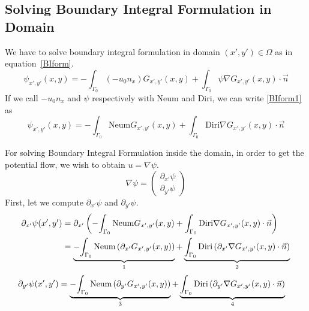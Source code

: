 \documentclass[a4paper,12pt]{article}
\newcommand{\integ}[3]{%
\ensuremath{\displaystyle{\int^{#2}_{#1} #3}}}
\begin{document}
\subsection{Solving Boundary Integral Formulation in Domain}

We have to solve boundary integral formulation in domain $(x',y')\in \Omega$ as in equation~\eqref{BIform}. 
\begin{equation}
 \psi_{x',y'}(x,y)=-\integ{\Gamma_0}{}{(-u_0 n_x)G_{x',y'}(x,y)} + \integ{\Gamma_0}{}{\psi\nabla G_{x',y'}(x,y)\cdot \vec{n}} \label{BIform1}
\end{equation}
If we call $-u_0 n_x$ and $\psi$ respectively with Neum and Diri, we can write \ref{BIform1} as
\begin{equation}
 \psi_{x',y'}(x,y)=-\integ{\Gamma_0}{}{\text{Neum}G_{x',y'}(x,y)} + \integ{\Gamma_0}{}{\text{Diri}\nabla G_{x',y'}(x,y)\cdot \vec{n}}
\end{equation}

For solving Boundary Integral Formulation inside the domain, in order to get the potential flow, we wish to obtain $u=\nabla\psi$.
\begin{equation}
 \nabla\psi=\left(\begin{array}{c}
      \partial_{x'}\psi \\
      \partial_{y'}\psi
    \end{array}\right) \label{nablaPsi}
\end{equation}
First, let we compute $\partial_{x'}\psi$ and $\partial_{y'}\psi$.
\begin{align}
 \partial_{x'}\psi(x',y')&=\partial_{x'}\left(-\integ{\Gamma_0}{}{\text{Neum}G_{x',y'}(x,y)} + \integ{\Gamma_0}{}{\text{Diri}\nabla G_{x',y'}(x,y)\cdot \vec{n}} \right)\\
&=  \underbrace{-\integ{\Gamma_0}{}{\text{Neum} \left(\partial_{x'}G_{x',y'}(x,y)\right)}}_\text{1}  +  
\underbrace{\integ{\Gamma_0}{}{\text{Diri}\left(\partial_{x'}\nabla G_{x',y'}(x,y)\cdot \vec{n}\right)}}_\text{2}\label{partialxaPsi} 
\end{align}
\begin{align}
 \partial_{y'}\psi(x',y')&=  \underbrace{-\integ{\Gamma_0}{}{\text{Neum} \left(\partial_{y'}G_{x',y'}(x,y)\right)}}_\text{3}  +  
\underbrace{\integ{\Gamma_0}{}{\text{Diri}\left(\partial_{y'}\nabla G_{x',y'}(x,y)\cdot \vec{n}\right)}}_\text{4} \label{partialyaPsi}
\end{align}
\end{document}
